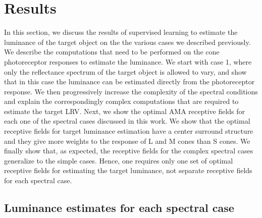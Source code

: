 \documentclass{jov}
\begin{document}
\section{Results} \label{Results}
In this section, we discuss the results of supervised learning to estimate the luminance of the target object on the the various cases we described previously. We describe the computations that need to be performed on the cone photoreceptor responses to estimate the luminance. We start with case 1, where only the reflectance spectrum of the target object is allowed to vary, and show that in this case the luminance can be estimated directly from the photoreceptor response. We then progressively increase the complexity of the spectral conditions and explain the correspondingly complex computations that are required to estimate the target LRV. Next, we show the optimal AMA receptive fields for each one of the spectral cases discussed in this work. We show that the optimal receptive fields for target luminance estimation have a center surround structure and they give more weights to the response of L and M cones than S cones. We finally show that, as expected, the receptive fields for the complex spectral cases generalize to the simple cases. Hence, one requires only one set of optimal receptive fields for estimating the target luminance, not separate receptive fields for each spectral case.

\subsection{Luminance estimates for each spectral case}
\end{document}
